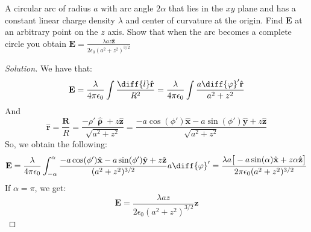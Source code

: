 \documentclass[crop=false,class=book,oneside]{standalone}
\begin{document}
            \begin{problem}[Wangsness 3-10]
                A circular arc of radius $a$ with arc angle $2\alpha$
                that lies in the $xy$ plane and has a constant linear
                charge density $\lambda$ and center of curvature at
                the origin. Find $\mathbf{E}$ at an arbitrary point
                on the $z$ axis. Show that when the arc becomes a
                complete circle you obtain
                $\mathbf{E}%
                 =\frac{\lambda{az}\hat{\mathbf{z}}}%
                       {2\epsilon_{0}(a^{2}+z^{2})^{3/2}}$
            \end{problem}
            \begin{proof}[Solution]
                We have that:
                \begin{equation*}
                    \mathbf{E}
                    =\frac{\lambda}{4\pi\epsilon_{0}}
                    \int\frac{\diff{l}\hat{\mathbf{r}}}{R^{2}}
                    =\frac{\lambda}{4\pi\epsilon_0}
                    \int\frac{a\diff{\varphi}'\hat{\mathbf{r}}}
                             {a^{2}+z^{2}}
                \end{equation*}
                And
                \begin{equation*}
                    \hat{\mathbf{r}}=\frac{\mathbf{R}}{R}
                    =\frac{-\rho'\hat{\boldsymbol{\uprho}}
                    +z\hat{\mathbf{z}}}{\sqrt{a^{2}+z^{2}}}
                    =\frac{-a\cos(\phi')\hat{\mathbf{x}}
                    -a\sin(\phi')\hat{\mathbf{y}}
                    +z\hat{\mathbf{z}}}{\sqrt{a^{2}+z^{2}}}    
                \end{equation*}
                So, we obtain the following:
                \begin{equation*}
                    \mathbf{E}
                    =\frac{\lambda}{4\pi\epsilon_0}
                    \int_{-\alpha}^{\alpha}
                    \frac{-a\cos(\phi')\hat{\mathbf{x}}
                          -a\sin(\phi')\hat{\mathbf{y}}
                          +z\hat{\mathbf{z}}}
                         {(a^{2}+z^{2})^{3/2}}a\diff{\varphi}'
                    =\frac{\lambda{a}\big[
                               -a\sin(\alpha)\hat{\mathbf{x}}
                               +z\alpha\hat{\mathbf{z}}
                           \big]}
                          {2\pi\epsilon_{0}(a^{2}+z^{2})^{3/2}}
                \end{equation*}
                If $\alpha=\pi$, we get:
                \begin{equation*}
                    \mathbf{E}
                    =\frac{\lambda az}
                          {2\epsilon_{0}(a^{2}+z^{2})^{3/2}}
                    \hat{\mathbf{z}}
                \end{equation*}
            \end{proof}
\end{document}

